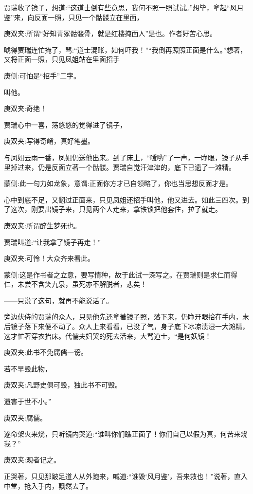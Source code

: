 \begin{parag}
    贾瑞收了镜子，想道:“这道士倒有些意思，我何不照一照试试。”想毕，拿起“风月鉴”来，向反面一照，只见一个骷髅立在里面，\begin{note}庚双夹:所谓“好知青冢骷髅骨，就是红楼掩面人”是也。作者好苦心思。\end{note}唬得贾瑞连忙掩了，骂:“道士混账，如何吓我！”“我倒再照照正面是什么。”想著，又将正面一照，只见凤姐站在里面招手\begin{note}庚侧:可怕是“招手”二字。\end{note}叫他。\begin{note}庚双夹:奇绝！\end{note}贾瑞心中一喜，荡悠悠的觉得进了镜子，\begin{note}庚双夹:写得奇峭，真好笔墨。\end{note}与凤姐云雨一番，凤姐仍送他出来。到了床上，“嗳哟”了一声，一睁眼，镜子从手里掉过来，仍是反面立著一个骷髅。贾瑞自觉汗津津的，底下已遗了一滩精。\begin{note}蒙侧:此一句力如龙象，意谓:正面你方才已自领略了，你也当思想反面才是。\end{note}心中到底不足，又翻过正面来，只见凤姐还招手叫他，他又进去。如此三四次。到了这次，刚要出镜子来，只见两个人走来，拿铁锁把他套住，拉了就走。\begin{note}庚双夹:所谓醉生梦死也。\end{note}贾瑞叫道:“让我拿了镜子再走！”\begin{note}庚双夹:可怜！大众齐来看此。\end{note}\begin{note}蒙侧:这是作书者之立意，要写情种，故于此试一深写之。在贾瑞则是求仁而得仁，未尝不含笑九泉，虽死亦不解脱者，悲矣！\end{note}——只说了这句，就再不能说话了。
\end{parag}


\begin{parag}
    旁边伏侍的贾瑞的众人，只见他先还拿著镜子照，落下来，仍睁开眼拾在手内，末后镜子落下来便不动了。众人上来看看，已没了气，身子底下冰凉渍湿一大滩精，这才忙著穿衣抬床。代儒夫妇哭的死去活来，大骂道士，“是何妖镜！\begin{note}庚双夹:此书不免腐儒一谤。\end{note}若不早毁此物，\begin{note}庚双夹:凡野史俱可毁，独此书不可毁。\end{note}遗害于世不小。”\begin{note}庚双夹:腐儒。\end{note}遂命架火来烧，只听镜内哭道:“谁叫你们瞧正面了！你们自己以假为真，何苦来烧我？”\begin{note}庚双夹:观者记之。\end{note}正哭著，只见那跛足道人从外跑来，喊道:“谁毁‘风月鉴’，吾来救也！”说著，直入中堂，抢入手内，飘然去了。
\end{parag}



